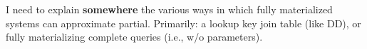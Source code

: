 \begin{inprogress}
I need to explain \textbf{somewhere} the various ways in which fully
materialized systems can approximate partial. Primarily: a lookup key join table
(like DD), or fully materializing complete queries (i.e., w/o parameters).
\end{inprogress}

\begin{comment}
http://www.vldb.org/pvldb/vol13/p1793-mcsherry.pdf
https://www.inf.ufrgs.br/prosoft/publications/2016/mertz-tse-2016-pre-print.pdf
https://people.csail.mit.edu/nickolai/papers/gupta-cachegenie.pdf
\end{comment}
